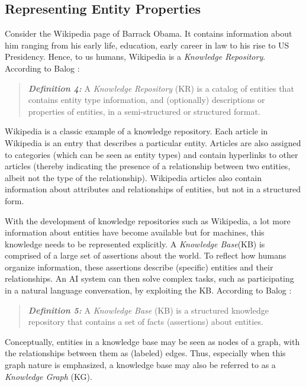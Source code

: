 \documentclass{article}
\begin{document}
\subsection{Representing Entity Properties}
\label{subsec:representing-entity-properties}

Consider the Wikipedia page of Barrack Obama. It contains information about him ranging from his early life, education, early career in law to his rise to US Presidency. Hence, to us humans, Wikipedia is a \textit{Knowledge Repository}. According to Balog \cite{balog2018entity}:
\begin{quote}
    \textit{\textbf{Definition 4:}} A \textit{Knowledge Repository} (KR) is a catalog of entities that contains entity type information, and (optionally) descriptions or properties of entities, in a semi-structured or structured format.
\end{quote}
Wikipedia is a classic example of a knowledge repository. Each article in Wikipedia is an entry that describes a particular entity. Articles are also assigned to categories (which can be seen as entity types) and contain hyperlinks to other articles (thereby indicating the presence of a relationship between two entities, albeit not the type of the relationship). Wikipedia articles also contain information about attributes and relationships of entities, but not in a structured form.

With the development of knowledge repositories such as Wikipedia, a lot more information about entities have become available but for machines, this knowledge needs to be represented explicitly. A \textit{Knowledge Base}(KB) is comprised of a large set of assertions about the world. To reflect how humans organize information, these assertions describe (specific) entities and their relationships. An AI system can then solve complex tasks, such as participating in a natural language conversation, by exploiting the KB. According to Balog \cite{balog2018entity}:
\begin{quote}
    \textit{\textbf{Definition 5:}} A \textit{Knowledge Base} (KB) is a structured knowledge repository that contains a set of facts (assertions) about entities.
\end{quote}
Conceptually, entities in a knowledge base may be seen as nodes of a graph, with the relationships between them as (labeled) edges. Thus, especially when this graph nature is emphasized, a knowledge base may also be referred to as a \textit{Knowledge Graph} (KG).

\end{document}
